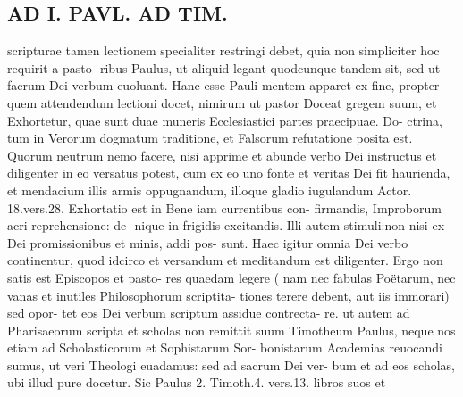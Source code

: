 \documentclass{article}
\begin{document}
\begin{pages}
\section*{AD I. PAVL. AD TIM. }
\marginpar{[ p.432 ]}scripturae tamen lectionem specialiter restringi debet, quia non simpliciter hoc requirit a pasto- ribus Paulus, ut aliquid legant quodcunque tandem sit, sed ut facrum Dei verbum euoluant. Hanc esse Pauli mentem apparet ex fine, propter quem attendendum lectioni docet, nimirum ut pastor Doceat gregem suum, et Exhortetur, quae sunt duae muneris Ecclesiastici partes praecipuae. Do- ctrina, tum in Verorum dogmatum traditione, et Falsorum refutatione posita est. Quorum neutrum nemo facere, nisi apprime et abunde verbo Dei instructus et diligenter in eo versatus potest, cum ex eo uno fonte et veritas Dei fit haurienda, et mendacium illis armis oppugnandum, illoque gladio iugulandum Actor. 18.vers.28. Exhortatio est in Bene iam currentibus con- firmandis, Improborum acri reprehensione: de- nique in frigidis excitandis. Illi autem stimuli:non nisi ex Dei promissionibus et minis, addi pos- sunt. Haec igitur omnia Dei verbo continentur, quod idcirco et versandum et meditandum est diligenter. Ergo non satis est Episcopos et pasto- res quaedam legere ( nam nec fabulas Poëtarum, nec vanas et inutiles Philosophorum scriptita- tiones terere debent, aut iis immorari) sed opor- tet eos Dei verbum scriptum assidue contrecta- re. ut autem ad Pharisaeorum scripta et scholas non remittit suum Timotheum Paulus, neque nos etiam ad Scholasticorum et Sophistarum Sor- bonistarum Academias reuocandi sumus, ut veri Theologi euadamus: sed ad sacrum Dei ver- bum et ad eos scholas, ubi illud pure docetur. Sic Paulus 2. Timoth.4. vers.13. libros suos et 

\end{pages}
\end{document}
